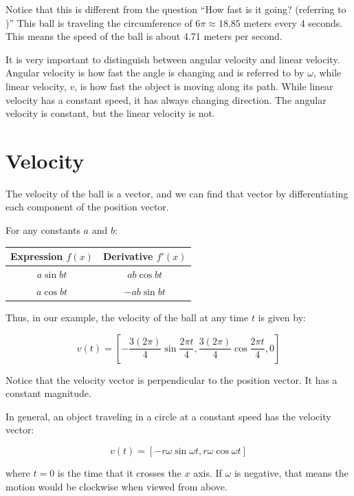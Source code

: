 Notice that this is different from the question ``How fast is it
going? (referring to )''  This ball is traveling the circumference of $6\pi \approx
  18.85$ meters every 4 seconds. This means the speed of the ball is about
4.71 meters per second.

It is very important to distinguish between angular velocity and linear velocity. Angular velocity is how fast the angle is changing and is referred to by $\omega$, while linear velocity, $v$, is how fast the object is moving along its path. While linear velocity has a constant speed, it has always changing direction. The angular velocity is constant, but the linear velocity is not.

\section{Velocity}
The velocity of the ball is a vector, and we can find that vector by
differentiating each component of the position vector.

For any constants $a$ and $b$:

\begin{tabular}{c | c }
  Expression $f(x)$ & Derivative $f'(x)$ \\
  \hline
  $a \sin{b t}$     & $ab \cos{b t}$     \\
  $a \cos{b t}$     & $-ab \sin{b t}$    \\
\end{tabular}

Thus, in our example, the velocity of the ball at any time $t$ is given by:

$$v(t) = \left[ -\frac{3 (2\pi)}{4} \sin{\frac{2\pi t}{4}}, \frac{3(2\pi)}{4} \cos{\frac{2\pi t}{4}}, 0 \right]$$

Notice that the velocity vector is perpendicular to the position vector. It has a constant magnitude.

In general, an object traveling in a circle at a constant speed has the velocity vector:

$$v(t) = \left[ -r\omega \sin{\omega t}, r\omega \cos{\omega t}\right]$$

where $t = 0$ is the time that it crosses the $x$ axis. If $\omega$ is
negative, that means the motion would be clockwise when viewed from
above.

